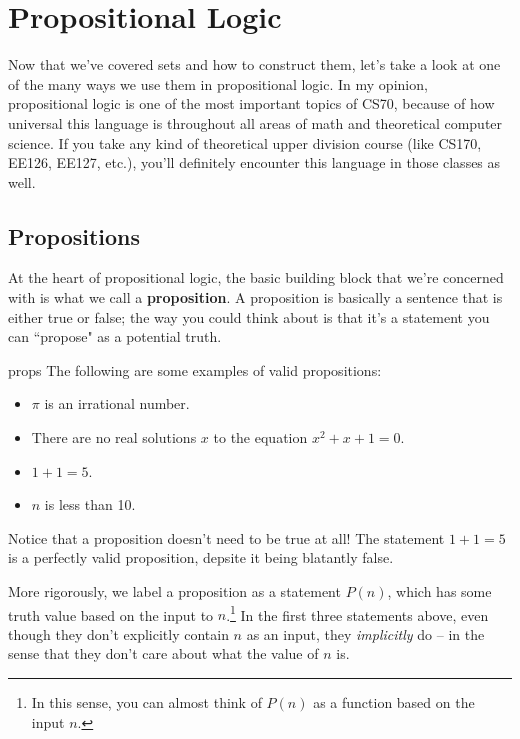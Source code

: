 \chapter{Propositional Logic}
Now that we've covered sets and how to construct them, let's take a look at one of the many ways we use them in 
propositional logic. In my opinion, propositional logic is one of the most important topics of CS70, because of how 
universal this language is throughout all areas of math and theoretical computer science. If you take any 
kind of theoretical upper division course (like CS170, EE126, EE127, etc.), you'll definitely encounter 
this language in those classes as well.  

\section{Propositions}
At the heart of propositional logic, the basic building block that we're concerned with is what we call a 
\textbf{proposition}. A proposition is basically a sentence that is either true or false; the way you 
could think about is that it's a statement you can ``propose" as a potential truth. 
\begin{example}{}{props}
	The following are some examples of valid propositions:
	\begin{itemize}
		\item \( \pi \) is an irrational number.
		\item There are no real solutions \( x \) to the equation \( x^2 + x + 1 = 0\). 
		\item \( 1 + 1 = 5 \).
		\item \( n \) is less than 10. 
	\end{itemize}
\end{example}
\begin{remark}{}{}
	Notice that a proposition doesn't need to be true at all! The statement \( 1 + 1 = 5 \) is a perfectly valid 
	proposition, depsite it being blatantly false.  
\end{remark}
More rigorously, we label a proposition as a statement \( P(n) \), which has some truth value 
based on the input to \( n \).\footnote{In this sense, you can almost think of \( P(n) \) as a function 
based on the input \( n \).} In the first three statements above, even though they don't explicitly contain 
\( n \) as an input, they \textit{implicitly} do -- in the sense that they don't care about what the value of 
\( n \) is. 

